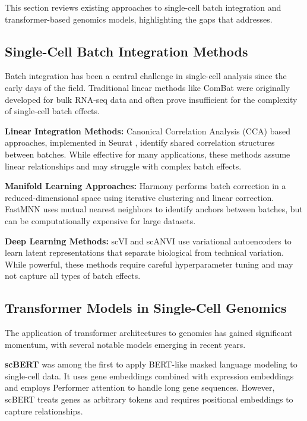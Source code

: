 This section reviews existing approaches to single-cell batch integration and transformer-based genomics models, highlighting the gaps that \bioformer{} addresses.

\subsection{Single-Cell Batch Integration Methods}

Batch integration has been a central challenge in single-cell analysis since the early days of the field. Traditional linear methods like ComBat \citep{johnson2007adjusting} were originally developed for bulk RNA-seq data and often prove insufficient for the complexity of single-cell batch effects.

\textbf{Linear Integration Methods:} Canonical Correlation Analysis (CCA) based approaches, implemented in Seurat \citep{stuart2019comprehensive}, identify shared correlation structures between batches. While effective for many applications, these methods assume linear relationships and may struggle with complex batch effects.

\textbf{Manifold Learning Approaches:} Harmony \citep{korsunsky2019fast} performs batch correction in a reduced-dimensional space using iterative clustering and linear correction. FastMNN \citep{haghverdi2018batch} uses mutual nearest neighbors to identify anchors between batches, but can be computationally expensive for large datasets.

\textbf{Deep Learning Methods:} scVI \citep{lopez2018deep} and scANVI \citep{xu2021probabilistic} use variational autoencoders to learn latent representations that separate biological from technical variation. While powerful, these methods require careful hyperparameter tuning and may not capture all types of batch effects.

\subsection{Transformer Models in Single-Cell Genomics}

The application of transformer architectures to genomics has gained significant momentum, with several notable models emerging in recent years.

\textbf{scBERT} \citep{yang2022scbert} was among the first to apply BERT-like masked language modeling to single-cell data. It uses gene embeddings combined with expression embeddings and employs Performer attention to handle long gene sequences. However, scBERT treats genes as arbitrary tokens and requires positional embeddings to capture relationships.

